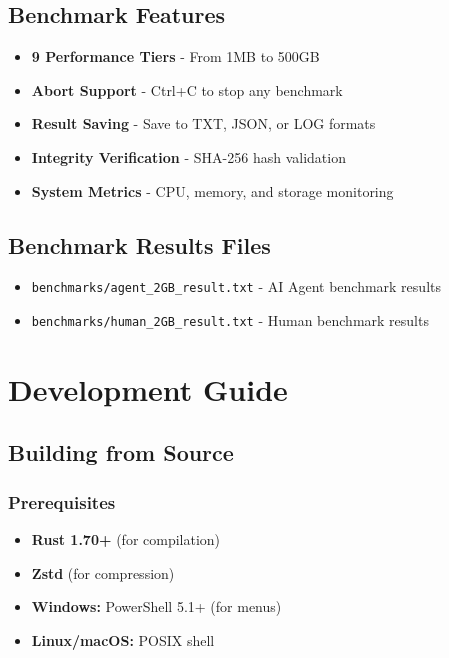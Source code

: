 \documentclass[11pt,a4paper]{article}
\begin{document}
	\subsection{Benchmark Features}
	\begin{itemize}
		\item \textbf{9 Performance Tiers} - From 1MB to 500GB
		\item \textbf{Abort Support} - Ctrl+C to stop any benchmark
		\item \textbf{Result Saving} - Save to TXT, JSON, or LOG formats
		\item \textbf{Integrity Verification} - SHA-256 hash validation
		\item \textbf{System Metrics} - CPU, memory, and storage monitoring
	\end{itemize}

	\subsection{Benchmark Results Files}
	\begin{itemize}
		\item \texttt{benchmarks/agent\_2GB\_result.txt} - AI Agent benchmark results
		\item \texttt{benchmarks/human\_2GB\_result.txt} - Human benchmark results
	\end{itemize}

	\section{Development Guide}
	\label{sec:development}

	\subsection{Building from Source}

	\subsubsection{Prerequisites}
	\begin{itemize}
		\item \textbf{Rust 1.70+} (for compilation)
		\item \textbf{Zstd} (for compression)
		\item \textbf{Windows:} PowerShell 5.1+ (for menus)
		\item \textbf{Linux/macOS:} POSIX shell
	\end{itemize}
\end{document}
